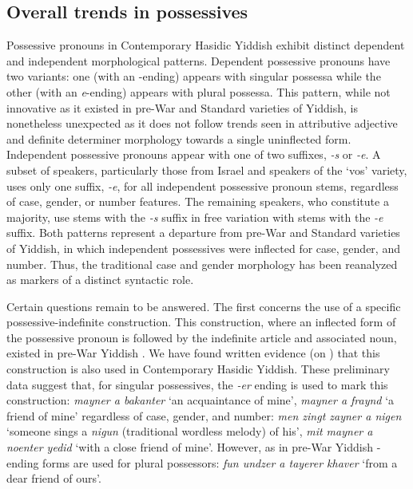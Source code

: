 \documentclass[output=paper, hidelinks]{langscibook}
\begin{document}

\subsection{Overall trends in possessives}

\largerpage
Possessive pronouns in Contemporary Hasidic Yiddish exhibit distinct dependent and independent morphological patterns. Dependent possessive pronouns have two variants: one (with an \varnothing-ending) appears with singular possessa while the other (with an \textit{e}-ending) appears with plural possessa. This pattern, while not innovative as it existed in pre-War and Standard varieties of Yiddish, is nonetheless unexpected as it does not follow trends seen in attributive adjective and definite determiner morphology towards a single uninflected form. Independent possessive pronouns appear with one of two suffixes, \textit{-s} or \textit{-e}. A subset of speakers, particularly those from Israel and speakers of the `vos' variety, uses only one suffix, \textit{-e}, for all independent possessive pronoun stems, regardless of case, gender, or number features. The remaining speakers, who constitute a majority, use stems with the \textit{-s} suffix in free variation with stems with the \textit{-e} suffix. Both patterns represent a departure from pre-War and Standard varieties of Yiddish, in which independent possessives were inflected for case, gender, and number. Thus, the traditional case and gender morphology has been reanalyzed as markers of a distinct syntactic role.


Certain questions remain to be answered. The first concerns the use of a specific possessive-indefinite construction. This construction, where an inflected form of the possessive pronoun is followed by the indefinite article and associated noun, existed in pre-War Yiddish \citep[109]{Katz87}. We have found written evidence (on \citealt{KaveShtiebel}) that this construction is also used in Contemporary Hasidic Yiddish. These preliminary data suggest that, for singular possessives, the \textit{-er} ending is used to mark this construction: \textit{mayner a bakanter} `an acquaintance of mine', \textit{mayner a fraynd} `a friend of mine' regardless of case, gender, and number: \textit{men zingt zayner a nigen} `someone sings a \textit{nigun} (traditional wordless melody) of his', \textit{mit mayner a noenter yedid} `with a close friend of mine'. However, as in pre-War Yiddish \citep[27--28]{Mazin27} \varnothing-ending forms are used for plural possessors: \textit{fun undzer a tayerer khaver} `from a dear friend of ours'.
\end{document}
